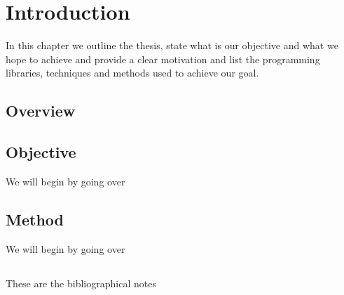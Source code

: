 %
%

\chapter{Introduction}

\begin{resumen}
In this chapter we outline the thesis, state what is our objective and what we hope to achieve and provide a clear motivation and list the programming libraries, techniques and methods used to achieve our goal.
\end{resumen}


\section{Overview}
\label{cap1:sec:overview}

\section{Objective}
\label{cap1:sec:objective}

We will begin by going over 

\section{Method}
\label{cap1:sec:method}

We will begin by going over 

\section*{\NotasBibliograficas}
\TocNotasBibliograficas

These are the bibliographical notes
\citep{ldesc2e}


